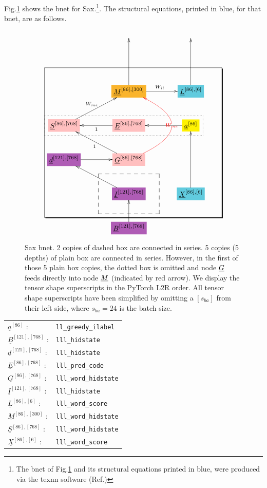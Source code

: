 Fig.\ref{fig-texnn-for-sentence-ax-bnet}
shows the bnet  for Sax.\footnote{The
bnet of Fig.\ref{fig-texnn-for-sentence-ax-bnet}
and its structural equations
printed in blue,
were produced via the texnn software (Ref.\cite{texnn})}. The structural equations, printed in
blue, for that bnet, are as follows.

\begin{figure}[h!]\centering
$$\xymatrix@R=2.5pc@C=3.5pc{
&&
\\
&&
\\
&*+[F*:Dandelion]{\underline{M}^{[86], [300]}}\ar[uu]\ar[r]^{W_{il}}&*+[F*:SkyBlue]{\underline{L}^{[86], [6]}}\ar[uu]
\\
*+[F*:pink]{\underline{S}^{[86], [768]}}\ar[ur]^{W_{me}}&*+[F*:pink]{\underline{E}^{[86], [768]}}\ar[l]^{1}&*+[F*:yellow]{\underline{a}^{[86]}}\ar[l]
\\
*+[F*:Orchid]{\underline{d}^{[121], [768]}}\ar[r]&*+[F*:pink]{\underline{G}^{[86], [768]}}\ar@[red]@/_5pc/[uu]|-{\color{red} W_{me}}\ar[ul]^{1}&
\\
&*+[F*:Orchid]{\underline{I}^{[121], [768]}}\ar[ul]&*+[F*:SkyBlue]{\underline{X}^{[86], [6]}}\ar[uu]
\\
&*+[F*:Orchid]{\underline{B}^{[121], [768]}}\ar[u]&
\save
\POS"3,1"."6,1"."3,3"."6,3"!C*+<4.8em>\frm{-,}
\POS"6,2"."6,2"."6,2"."6,2"!C*+<3.8em>\frm{--}
\POS"4,1"."4,1"."4,3"."4,3"!C*+<1.0em>\frm{.}
\restore
}$$
\caption{Sax bnet. 2 copies of dashed box are connected in series. 5 copies (5 depths) of plain box are connected in series.  However, in the first of those 5 plain box copies, the dotted box  is omitted and node $\ul{G}$ feeds directly into node  $\ul{M}$ (indicated by red arrow). We display the tensor shape superscripts in the PyTorch L2R order. All tensor shape superscripts have been simplified by omitting a $[s_{ba}]$ from their left side, where $s_{ba}=24$ is the batch size. }
\label{fig-texnn-for-sentence-ax-bnet}
\end{figure}

\begin{tabular}{ll}
$\underline{a}^{[86]}$ :&{\tt ll\_greedy\_ilabel}\\
$\underline{B}^{[121], [768]}$ :&{\tt lll\_hidstate}\\
$\underline{d}^{[121], [768]}$ :&{\tt lll\_hidstate}\\
$\underline{E}^{[86], [768]}$ :&{\tt lll\_pred\_code}\\
$\underline{G}^{[86], [768]}$ :&{\tt lll\_word\_hidstate}\\
$\underline{I}^{[121], [768]}$ :&{\tt lll\_hidstate}\\
$\underline{L}^{[86], [6]}$ :&{\tt lll\_word\_score}\\
$\underline{M}^{[86], [300]}$ :&{\tt lll\_word\_hidstate}\\
$\underline{S}^{[86], [768]}$ :&{\tt lll\_word\_hidstate}\\
$\underline{X}^{[86], [6]}$ :&{\tt lll\_word\_score}
\end{tabular}



